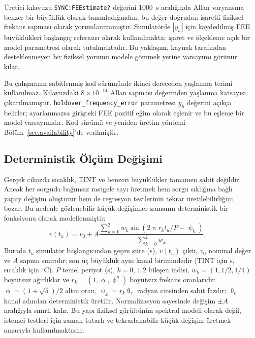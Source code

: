 \documentclass[9pt,twocolumn,a4paper]{extarticle}
\begin{document}
Üretici kılavuzu \texttt{SYNC:FEEstimate?} değerini 1000~s aralığında Allan varyansına benzer bir büyüklük olarak tanımladığından, bu değer doğrudan işaretli fiziksel frekans sapması olarak yorumlanmamıştır. Simülatörde $|y_h|$ için kaydedilmiş FEE büyüklükleri başlangıç referansı olarak kullanılmakta; işaret ve ölçekleme açık bir model parametresi olarak tutulmaktadır. Bu yaklaşım, kaynak tarafından desteklenmeyen bir fiziksel yorumu modele gömmek yerine varsayımı görünür kılar.

Bu çalışmanın sabitlenmiş kod sürümünde ikinci dereceden yaşlanma terimi kullanılmaz. Kılavuzdaki $8\times10^{-14}$ Allan sapması değerinden yaşlanma katsayısı çıkarılmamıştır. \texttt{holdover\_frequency\_error} parametresi $y_h$ değerini açıkça belirler; ayarlanmazsa girişteki FEE pozitif eğim olarak eşlenir ve bu eşleme bir model varsayımıdır. Kod sürümü ve yeniden üretim yöntemi Bölüm~\ref{sec:availability}'de verilmiştir.

\subsection{Deterministik Ölçüm Değişimi}
Gerçek cihazda sıcaklık, TINT ve benzeri büyüklükler tamamen sabit değildir. Ancak her sorguda bağımsız rastgele sayı üretmek hem sorgu sıklığına bağlı yapay değişim oluşturur hem de regresyon testlerinin tekrar üretilebilirliğini bozar. Bu nedenle gözlenebilir küçük değişimler zamanın deterministik bir fonksiyonu olarak modellenmiştir:
\begin{equation}
 v(t_u)=v_0+A\frac{\sum_{k=0}^{2}w_k\sin\!\left(2\uppi r_k t_u/P+\uppsi_k\right)}{\sum_{k=0}^{2}w_k},
 \label{eq:variation}
\end{equation}
Burada $t_u$ simülatör başlangıcından geçen süre (s), $v(t_u)$ çıktı, $v_0$ nominal değer ve $A$ sapma sınırıdır; son üç büyüklük aynı kanal birimindedir (TINT için s, sıcaklık için $^{\circ}$C). $P$ temel periyot (s), $k=0,1,2$ bileşen indisi, $w_k=(1,1/2,1/4)$ boyutsuz ağırlıklar ve $r_k=(1,\upphi,\upphi^2)$ boyutsuz frekans oranlarıdır. $\upphi=(1+\sqrt{5})/2$ altın oran, $\uppsi_k=r_k\uptheta_c$ radyan cinsinden sabit fazdır; $\uptheta_c$ kanal adından deterministik üretilir. Normalizasyon sayesinde değişim $\pm A$ aralığıyla sınırlı kalır. Bu yapı fiziksel gürültünün spektral modeli olarak değil, istemci testleri için zaman-tutarlı ve tekrarlanabilir küçük değişim üretmek amacıyla kullanılmaktadır.
\end{document}
